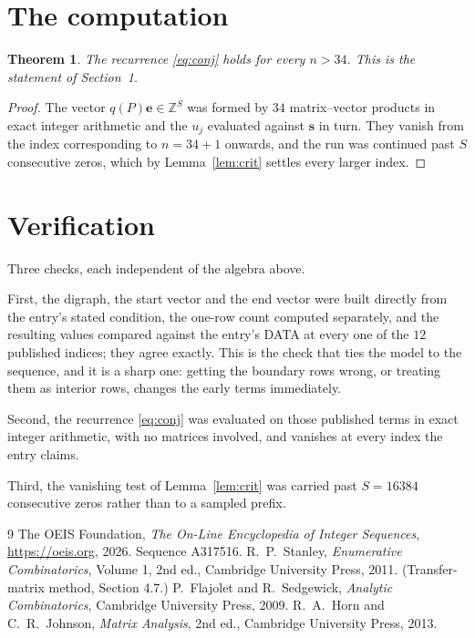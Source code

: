 \documentclass[11pt,a4paper]{article}
\theoremstyle{plain}
\newtheorem{theorem}{Theorem}
\theoremstyle{definition}
\begin{document}
\section{The computation}

\begin{theorem}
The recurrence \eqref{eq:conj} holds for every $n>34$. This is the statement of
Section~1.
\end{theorem}

\begin{proof}
The vector $q(P)\mathbf{e}\in\mathbb{Z}^{S}$ was formed by $34$ matrix--vector
products in exact integer arithmetic and the $u_j$ evaluated against $\mathbf{s}$ in turn.
They vanish from the index corresponding to $n=34+1$ onwards, and the run was continued
past $S$ consecutive zeros, which by Lemma~\ref{lem:crit} settles every larger index.
\end{proof}

\section{Verification}

Three checks, each independent of the algebra above.

First, the digraph, the start vector and the end vector were built directly from the
entry's stated condition, the one-row count computed separately, and the resulting values
compared against the entry's DATA at every one of the $12$ published indices; they
agree exactly. This is the check that ties the model to the sequence, and it is a sharp one:
getting the boundary rows wrong, or treating them as interior rows, changes the early terms
immediately.

Second, the recurrence \eqref{eq:conj} was evaluated on those published terms in exact
integer arithmetic, with no matrices involved, and vanishes at every index the entry claims.

Third, the vanishing test of Lemma~\ref{lem:crit} was carried past $S=16384$ consecutive
zeros rather than to a sampled prefix.

\begin{thebibliography}{9}
 The OEIS Foundation, \emph{The On-Line Encyclopedia of Integer
Sequences}, \url{https://oeis.org}, 2026. Sequence A317516.
 R.~P.~Stanley, \emph{Enumerative Combinatorics}, Volume 1, 2nd ed.,
Cambridge University Press, 2011. (Transfer-matrix method, Section 4.7.)
 P.~Flajolet and R.~Sedgewick, \emph{Analytic Combinatorics}, Cambridge
University Press, 2009.
 R.~A.~Horn and C.~R.~Johnson, \emph{Matrix Analysis}, 2nd ed., Cambridge
University Press, 2013.
\end{thebibliography}
\end{document}
